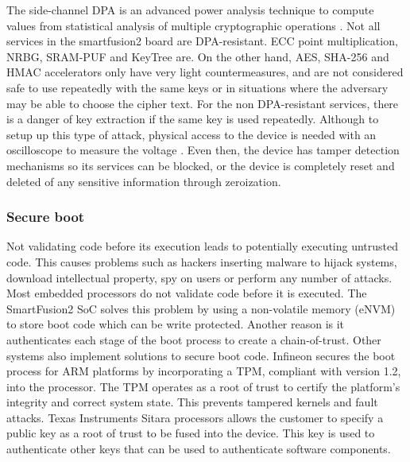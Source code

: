 The side-channel \ac{DPA} is an advanced power analysis technique to compute values from statistical analysis of multiple cryptographic operations \cite{kocher1999differential}.
Not all services in the smartfusion2 board are \ac{DPA}-resistant. ECC point multiplication, \ac{NRBG}, SRAM-PUF and KeyTree are.
On the other hand, AES, SHA-256 and HMAC accelerators only have very light countermeasures, and are not considered safe to use repeatedly with the same keys or in situations where the adversary may be able to choose the cipher text.
For the non \ac{DPA}-resistant services, there is a danger of key extraction if the same key is used repeatedly.
Although to setup up this type of attack, physical access to the device is needed with an oscilloscope to measure the voltage \cite{dpaKocher2011}. Even then, the device has tamper detection mechanisms so its services can be blocked, or the device is completely reset and deleted of any sensitive information through zeroization.

\subsubsection*{Secure boot}
Not validating code before its execution leads to potentially executing untrusted code. This causes problems such as hackers inserting malware to hijack systems, download intellectual property, spy on users or perform any number of attacks.
Most embedded processors do not validate code before it is executed. The SmartFusion2 \ac{SoC} solves this problem by using a non-volatile memory (eNVM) to store boot code which can be write protected. Another reason is it authenticates each stage of the boot process to create a chain-of-trust.
Other systems also implement solutions to secure boot code. Infineon secures the boot process for ARM platforms by incorporating a \ac{TPM}, compliant with version 1.2, into the processor. The \ac{TPM} operates as a root of trust to certify the platform's integrity and correct system state. This prevents tampered kernels and fault attacks.
Texas Instruments Sitara processors allows the customer to specify a public key as a root of trust to be fused into the device. This key is used to authenticate other keys that can be used to authenticate software components.

